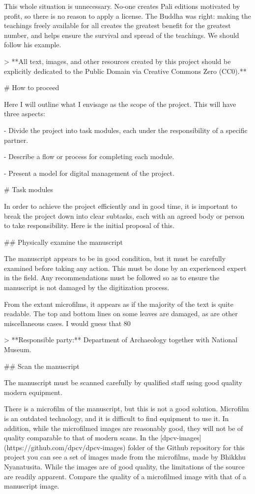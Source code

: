 \documentclass[11pt, openany,a5paper]{article}
\begin{document}
\begin{markdown}
This whole situation is unnecessary. No-one creates Pali editions motivated by profit, so there is no reason to apply a license. The Buddha was right: making the teachings freely available for all creates the greatest benefit for the greatest number, and helps ensure the survival and spread of the teachings. We should follow his example.

> **All text, images, and other resources created by this project should be explicitly dedicated to the Public Domain via Creative Commons Zero (CC0).**

# How to proceed

Here I will outline what I envisage as the scope of the project. This will have three aspects:

- Divide the project into task modules, each under the responsibility of a specific partner.

- Describe a flow or process for completing each module.

- Present a model for digital management of the project.

# Task modules

In order to achieve the project efficiently and in good time, it is important to break the project down into clear subtasks, each with an agreed body or person to take responsibility. Here is the initial proposal of this.

## Physically examine the manuscript

The manuscript appears to be in good condition, but it must be carefully examined before taking any action. This must be done by an experienced expert in the field. Any recommendations must be followed so as to ensure the manuscript is not damaged by the digitization process.

From the extant microfilms, it appears as if the majority of the text is quite readable. The top and bottom lines on some leaves are damaged, as are other miscellaneous cases. I would guess that 80%

   > **Responsible party:** Department of Archaeology together with National Museum.

## Scan the manuscript

The manuscript must be scanned carefully by qualified staff using good quality modern equipment.

There is a microfilm of the manuscript, but this is not a good solution. Microfilm is an outdated technology, and it is difficult to find equipment to use it. In addition, while the microfilmed images are reasonably good, they will not be of quality comparable to that of modern scans. In the [dpcv-images](https://github.com/dpcv/dpcv-images) folder of the Github repository for this project you can see a set of images made from the microfilms, made by Bhikkhu Nyanatusita. While the images are of good quality, the limitations of the source are readily apparent. Compare the quality of a microfilmed image with that of a manuscript image.


\end{markdown}
\end{document}
